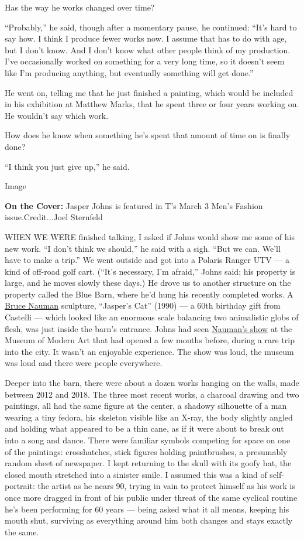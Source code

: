 Has the way he works changed over time?

``Probably,'' he said, though after a momentary pause, he continued:
``It's hard to say how. I think I produce fewer works now. I assume that
has to do with age, but I don't know. And I don't know what other people
think of my production. I've occasionally worked on something for a very
long time, so it doesn't seem like I'm producing anything, but
eventually something will get done.''

He went on, telling me that he just finished a painting, which would be
included in his exhibition at Matthew Marks, that he spent three or four
years working on. He wouldn't say which work.

How does he know when something he's spent that amount of time on is
finally done?

``I think you just give up,'' he said.

Image

\textbf{On the Cover:} Jasper Johns is featured in T's March 3 Men's
Fashion issue.Credit...Joel Sternfeld

WHEN WE WERE finished talking, I asked if Johns would show me some of
his new work. ``I don't think we should,'' he said with a sigh. ``But we
can. We'll have to make a trip.'' We went outside and got into a Polaris
Ranger UTV --- a kind of off-road golf cart. (``It's necessary, I'm
afraid,'' Johns said; his property is large, and he moves slowly these
days.) He drove us to another structure on the property called the Blue
Barn, where he'd hung his recently completed works. A
\href{https://www.nytimes.com/2018/10/15/t-magazine/bruce-nauman-art-interview.html}{Bruce
Nauman} sculpture, ``Jasper's Cat'' (1990) --- a 60th birthday gift from
Castelli --- which looked like an enormous scale balancing two
animalistic globs of flesh, was just inside the barn's entrance. Johns
had seen \href{https://www.moma.org/calendar/exhibitions/3852}{Nauman's
show} at the Museum of Modern Art that had opened a few months before,
during a rare trip into the city. It wasn't an enjoyable experience. The
show was loud, the museum was loud and there were people everywhere.

Deeper into the barn, there were about a dozen works hanging on the
walls, made between 2012 and 2018. The three most recent works, a
charcoal drawing and two paintings, all had the same figure at the
center, a shadowy silhouette of a man wearing a tiny fedora, his
skeleton visible like an X-ray, the body slightly angled and holding
what appeared to be a thin cane, as if it were about to break out into a
song and dance. There were familiar symbols competing for space on one
of the paintings: crosshatches, stick figures holding paintbrushes, a
presumably random sheet of newspaper. I kept returning to the skull with
its goofy hat, the closed mouth stretched into a sinister smile. I
assumed this was a kind of self-portrait: the artist as he nears 90,
trying in vain to protect himself as his work is once more dragged in
front of his public under threat of the same cyclical routine he's been
performing for 60 years --- being asked what it all means, keeping his
mouth shut, surviving as everything around him both changes and stays
exactly the same.

